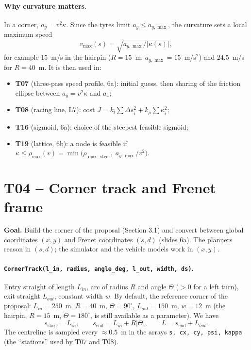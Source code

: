 \documentclass[11pt,a4paper]{article}
\newcommand{\code}[1]{\texttt{#1}}
\begin{document}
\paragraph{Why curvature matters.} In a corner, $a_y = v^2\kappa$. Since the tyres limit
$a_y \le a_{y,\max}$, the curvature sets a local maximum speed
\[ v_{\max}(s) = \sqrt{a_{y,\max}/|\kappa(s)|}, \]
for example $15$~m/s in the hairpin ($R=15$~m, $a_{y,\max}=15$~m/s$^2$) and $24.5$~m/s for
$R=40$~m. It is then used in:
\begin{itemize}
  \item \textbf{T07} (three-pass speed profile, 6a): initial guess, then sharing of the friction
  ellipse between $a_y = v^2\kappa$ and $a_x$;
  \item \textbf{T08} (racing line, L7): cost $J = k_l\sum \Delta s_i^2 + k_\rho \sum \kappa_i^2$;
  \item \textbf{T16} (sigmoid, 6a): choice of the steepest feasible sigmoid;
  \item \textbf{T19} (lattice, 6b): a node is feasible if $\kappa \le \rho_{\max}(v)
  = \min\big(\rho_{\max,\text{steer}},\; a_{y,\max}/v^2\big)$.
\end{itemize}

\section{T04 -- Corner track and Frenet frame}
\textbf{Goal.} Build the corner of the proposal (Section 3.1) and convert between global
coordinates $(x,y)$ and Frenet coordinates $(s,d)$ (slides 6a). The planners reason in $(s,d)$;
the simulator and the vehicle models work in $(x,y)$.

\paragraph{\code{CornerTrack(l\_in, radius, angle\_deg, l\_out, width, ds)}.}
Entry straight of length $L_{in}$, arc of radius $R$ and angle $\Theta$ ($>0$ for a left turn),
exit straight $L_{out}$, constant width $w$. By default, the reference corner of the proposal: $L_{in}=250$~m, $R=40$~m,
$\Theta=90^\circ$, $L_{out}=150$~m, $w=12$~m (the hairpin, $R=15$~m, $\Theta=180^\circ$, is still available as a parameter). We have
\[ s_{\text{start}} = L_{in}, \qquad s_{\text{end}} = L_{in} + R|\Theta|, \qquad
   L = s_{\text{end}} + L_{out}. \]
The centreline is sampled every $\approx 0.5$~m in the arrays \code{s, cx, cy, psi, kappa}
(the ``stations'' used by T07 and T08).
\end{document}
